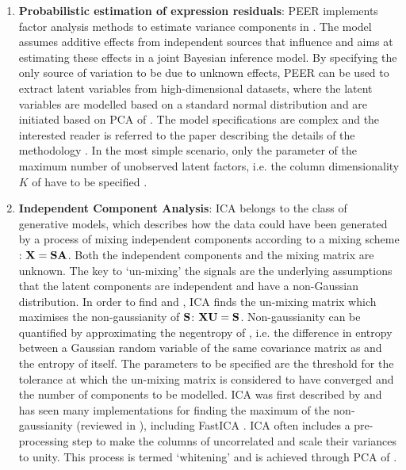 \begin{enumerate}
\item\textbf{Probabilistic estimation of expression residuals}: PEER implements factor analysis methods to estimate variance components in . The model assumes additive effects from independent sources that influence  and aims at estimating these effects in a joint Bayesian inference model.  By specifying the only source of variation to be due to unknown effects, PEER can be used to extract latent variables from high-dimensional datasets, where the latent variables are modelled based on a standard normal distribution and are initiated based on PCA of . The model specifications are complex and the interested reader is referred to the paper describing the details of the methodology \citep{Stegle2010}. In the most simple scenario, only the parameter of the maximum number of unobserved latent factors, i.e. the column dimensionality \(K\) of  have to be specified \citep{Stegle2012}. 

\item\textbf{Independent Component Analysis}:  ICA belongs to the class of generative models, which describes how the data  could have been generated by a process of mixing independent components  according to a mixing scheme : \(\boldsymbol{\mathbf{X}} = \boldsymbol{\mathbf{SA}}\). Both the independent components and the mixing matrix are unknown. The key to `un-mixing' the signals are the underlying assumptions that the latent components are independent and have a non-Gaussian distribution. In order to find  and , ICA finds the un-mixing matrix  which maximises the non-gaussianity of \(\boldsymbol{\mathbf{S}}\): \(\boldsymbol{\mathbf{XU}}=\boldsymbol{\mathbf{S}}\). Non-gaussianity can be quantified by approximating the negentropy of  , i.e. the difference in entropy between a Gaussian random variable of the same covariance matrix as  and the entropy of  itself. The parameters to be specified are the threshold for the tolerance at which the un-mixing matrix is considered to have converged and the number of components to be modelled.  ICA was first described by \citet{Herault1986} and has seen many implementations for finding the maximum of the non-gaussianity (reviewed in \citep{Comon1994}), including FastICA \citep{Hyvarinen2000}. ICA often includes a pre-processing step to make the columns of  uncorrelated and scale their variances to unity. This process is termed  `whitening' and is achieved through PCA of . 


\end{enumerate}
